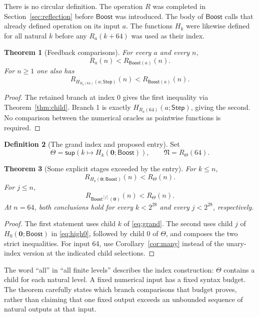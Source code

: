 \documentclass[11pt]{article}
\newtheorem{theorem}{Theorem}[section]
\theoremstyle{definition}
\newtheorem{definition}[theorem]{Definition}
\newcommand{\Sup}{\mathsf{sup}}
\newcommand{\leaf}{\mathbf 0}
\newcommand{\Boost}{\mathsf{Boost}}
\newcommand{\Step}{\mathsf{Step}}
\newcommand{\Entry}{\mathfrak N}
\begin{document}
There is no circular definition. The operation $R$ was completed in
Section~\ref{sec:reflection} before $\Boost$ was introduced. The body of
$\Boost$ calls that already defined operation on its input $a$. The
functions $H_k$ were likewise defined for all natural $k$ before any
$R_a(k+64)$ was used as their index.

\begin{theorem}[Feedback comparisons]\label{thm:boost}
For every $a$ and every $n$,
\[
 R_a(n)<R_{\Boost(a)}(n).
\]
For $n\ge1$ one also has
\[
 R_{H_{R_a(64)}(a;\Step)}(n)<R_{\Boost(a)}(n).
\]
\end{theorem}
\begin{proof}
The retained branch at index 0 gives the first inequality via
Theorem~\ref{thm:child}. Branch 1 is exactly
$H_{R_a(64)}(a;\Step)$, giving the second. No comparison between the
numerical oracles as pointwise functions is required.
\end{proof}

\begin{definition}[The grand index and proposed entry]
Set
\begin{equation}\label{eq:grand}
 \Theta=\Sup(k\mapsto H_k(\leaf;\Boost)),\qquad
 \Entry=R_\Theta(64).
\end{equation}
\end{definition}

\begin{theorem}[Some explicit stages exceeded by the entry]\label{thm:grand}
For $k\le n$,
\[
 R_{H_k(\leaf;\Boost)}(n)<R_\Theta(n).
\]
For $j\le n$,
\[
 R_{\Boost^{[j]}(\leaf)}(n)<R_\Theta(n).
\]
At $n=64$, both conclusions hold for every $k<2^{28}$ and every $j<2^{28}$,
respectively.
\end{theorem}
\begin{proof}
The first statement uses child $k$ of \eqref{eq:grand}. The second uses
child $j$ of $H_0(\leaf;\Boost)$ in \eqref{eq:high0}, followed by child 0
of $\Theta$, and composes the two strict inequalities. For input 64, use
Corollary~\ref{cor:many} instead of the unary-index version at the indicated
child selections.
\end{proof}

The word ``all'' in ``all finite levels'' describes the index construction:
$\Theta$ contains a child for each natural level. A fixed numerical input
has a fixed syntax budget. The theorem carefully states which branch
comparisons that budget proves, rather than claiming that one fixed output
exceeds an unbounded sequence of natural outputs at that input.
\end{document}
